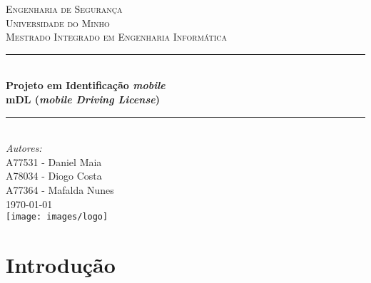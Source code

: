 \documentclass[11pt]{article}
\begin{document}
\sloppy

\begin{titlepage}

\newcommand{\HRule}{\rule{\linewidth}{0.5mm}}

\center %
 
\textsc{\LARGE Engenharia de Segurança}\\[1.5cm]
\textsc{\Large Universidade do Minho}\\[0.5cm]
\textsc{\large Mestrado Integrado em Engenharia Informática}\\[0.6cm]

\vspace{0.8cm}
\HRule \\[0.6cm]
{ \huge \bfseries Projeto em Identificação \textit{mobile}}\\[0.4cm]
{ \Large \bfseries \textbf{mDL} (\textit{mobile Driving License})} \\[0.4cm]
\HRule \\[1.2cm]

\Large \emph{Autores:}\\
A77531 - Daniel Maia\\
A78034 - Diogo Costa\\
A77364 - Mafalda Nunes\\[1.3cm]

{\large \today}\\[1.5cm]

\texttt{[image: images/logo]}\\[1cm]

\vfill %

\end{titlepage}


\begin{abstract}
\end{abstract}

\vspace{0.8cm}

\tableofcontents

\newpage


\section{Introdução}

\end{document}
